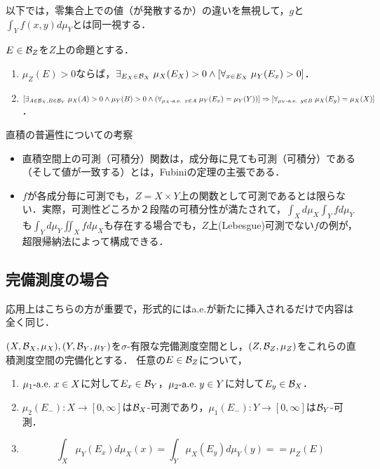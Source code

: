 \documentclass[uplatex, dvipdfmx]{jsreport}
\begin{document}
\begin{remark}[Fubiniの定理の暗黙の前提]
    以下では，零集合上での値（が発散するか）の違いを無視して，$g$と$\int_Yf(x,y)d\mu_Y$とは同一視する．
\end{remark}

\begin{corollary}[Fubiniの定理の論理的解釈]
    $E\in\mathcal{B}_Z$を$Z$上の命題とする．
    \begin{enumerate}
        \item $\mu_Z(E)>0$ならば，$\exists_{E_X\in\mathcal{B}_X}\;\mu_X(E_X)>0\land[\forall_{x\in E_X}\;\mu_Y(E_x)>0]$．
        \item $[\exists_{A\in\mathcal{B}_X,B\in\mathcal{B}_Y}\;\mu_X(A)>0\land\mu_Y(B)>0\land(\forall_{\mu_X\textrm{-a.e.}\;\; x\in A}\;\mu_Y(E_x)=\mu_Y(Y))]\Rightarrow [\forall_{\mu_Y\textrm{-a.e.}\;\; y\in B}\;\mu_X(E_y)=\mu_X(X)]$．
    \end{enumerate}
\end{corollary}

\begin{itembox}[l]{直積の普遍性についての考察}
    \begin{itemize}
        \item 直積空間上の可測（可積分）関数は，成分毎に見ても可測（可積分）である（そして値が一致する）とは，Fubiniの定理の主張である．
        \item $f$が各成分毎に可測でも，$Z=X\times Y$上の関数として可測であるとは限らない．実際，可測性どころか２段階の可積分性が満たされて，$\int_Xd\mu_X\int_Yfd\mu_Y$も$\int_Yd\mu_Y\iint_Xfd\mu_X$も存在する場合でも，$Z$上(Lebesgue)可測でない$f$の例が，超限帰納法によって構成できる．
    \end{itemize}
\end{itembox}

\subsection{完備測度の場合}

\begin{tcolorbox}[colframe=ForestGreen, colback=ForestGreen!10!white,breakable,colbacktitle=ForestGreen!40!white,coltitle=black,fonttitle=\bfseries\sffamily,
title=]
    応用上はこちらの方が重要で，形式的にはa.e.が新たに挿入されるだけで内容は全く同じ．
\end{tcolorbox}

\begin{theorem}
    $(X,\mathcal{B}_X,\mu_X),(Y,\mathcal{B}_Y,\mu_Y)$を$\sigma$-有限な完備測度空間とし，$(Z,\mathcal{B}_Z,\mu_Z)$をこれらの直積測度空間の完備化とする．
    任意の$E\in\mathcal{B}_Z$について，
    \begin{enumerate}
        \item $\mu_1\textrm{-a.e.}\; x\in X$に対して$E_x\in\mathcal{B}_Y$，$\mu_2\textrm{-a.e.}\; y\in Y$に対して$E_y\in\mathcal{B}_X$．
        \item $\mu_2(E_-):X\to[0,\infty]$は$\mathcal{B}_X$-可測であり，$\mu_1(E_-):Y\to[0,\infty]$は$\mathcal{B}_Y$-可測．
        \item \[\int_X\mu_Y(E_x)d\mu_X(x)=\int_Y\mu_X(E_y)d\mu_Y(y)==\mu_Z(E)\]
    \end{enumerate}
\end{theorem}
\end{document}
